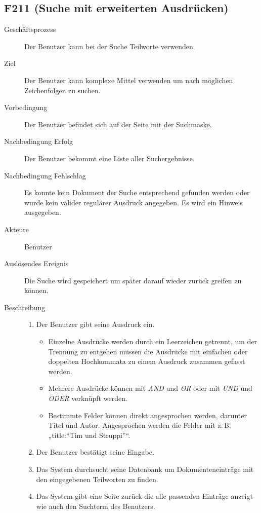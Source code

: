 \subsection{F211 (Suche mit erweiterten Ausdrücken)}
\label{F:extSuche}
\begin{description}
  \item[Geschäftsprozess]Der Benutzer kann bei der Suche Teilworte verwenden.
  \item[Ziel]Der Benutzer kann komplexe Mittel verwenden um nach möglichen Zeichenfolgen zu suchen.
  \item[Vorbedingung]Der Benutzer befindet sich auf der Seite mit der Suchmaske.
  \item[Nachbedingung Erfolg]Der Benutzer bekommt eine Liste aller Suchergebnisse.
  \item[Nachbedingung Fehlschlag]Es konnte kein Dokument der Suche entsprechend gefunden werden oder wurde kein valider regulärer Ausdruck angegeben. Es wird ein Hinweis ausgegeben.
  \item[Akteure]Benutzer
  \item[Auslösendes Ereignis]Die Suche wird gespeichert um später darauf wieder zurück greifen zu können.
  \item[Beschreibung]\hfill
    \begin{enumerate}
      \item Der Benutzer gibt seine Ausdruck ein. 
	\begin{itemize}
	  \item Einzelne Ausdrücke werden durch ein Leerzeichen getrennt, um der Trennung zu entgehen müssen die Ausdrücke mit einfachen oder doppelten Hochkommata zu einem Ausdruck zusammen gefasst werden. 
	  \item Mehrere Ausdrücke können mit \emph{AND} und \emph{OR} oder mit \emph{UND} und \emph{ODER} verknüpft werden.
	  \item Bestimmte Felder können direkt angesprochen werden, darunter Titel und Autor. Angesprochen werden die Felder mit z.\,B. „title:``Tim und Struppi''“.
	\end{itemize}
      \item Der Benutzer bestätigt seine Eingabe.
      \item Das System durchsucht seine Datenbank um Dokumenteneinträge mit den eingegebenen Teilworten zu finden.
      \item Das System gibt eine Seite zurück die alle passenden Einträge anzeigt wie auch den Suchterm des Benutzers.
    \end{enumerate}
\end{description}

